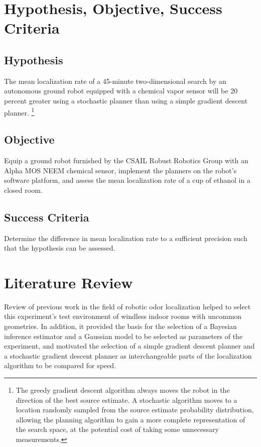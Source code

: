 \documentclass[submit, 12pt]{aiaa-pretty-modified}
\begin{document}
\section{Hypothesis, Objective, Success Criteria}
\label{sec:hos}
\subsection*{Hypothesis} 
The mean localization rate of a 45-minute two-dimensional search by an
autonomous ground robot equipped with a chemical vapor sensor will be 20 percent
greater using a stochastic planner than using a simple gradient descent planner.
\footnote{ The greedy gradient descent algorithm always moves the robot in the
  direction of the best source estimate. A stochastic algorithm moves to a
  location randomly sampled from the source estimate probability distribution,
  allowing the planning algorithm to gain a more complete representation of the
  search space, at the potential cost of taking some unnecessary measurements.}

\subsection*{Objective}
Equip a ground robot furnished by the CSAIL Robust Robotics Group with an Alpha MOS NEEM chemical sensor, implement the planners on the robot's software platform, and assess the mean localization rate of a cup of ethanol in a closed room.

\subsection*{Success Criteria} 
Determine the difference in mean localization rate to a sufficient precision such that the hypothesis can be assessed.

\section{Literature Review}
\label{sec:lit-review}
Review of previous work in the field of robotic odor localization helped to select
this experiment's test environment of windless indoor rooms with uncommon
geometries. In addition, it provided the basis for the selection of a Bayesian inference
estimator and a Gaussian model to be selected as parameters of the experiment, and
motivated the selection of a simple gradient descent planner and a stochastic
gradient descent planner as interchangeable parts of the localization algorithm
to be compared for speed.
\end{document}
